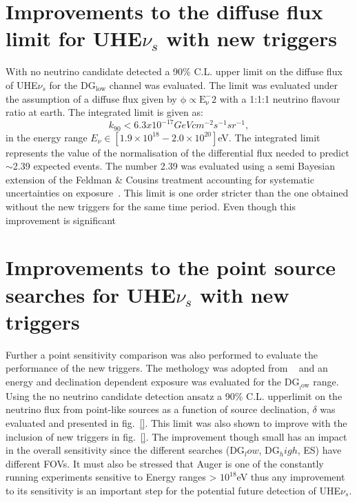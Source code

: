 \section*{Improvements to the diffuse flux limit for UHE$\nu_s$ with new triggers}
With no neutrino candidate detected a 90\% C.L. upper limit on the diffuse flux of UHE$\nu_s$ for the DG$\mathrm{_{low}}$ channel was evaluated. The limit was evaluated under the assumption of a diffuse flux given by $\mathrm{\phi \propto E_{\nu}^-2}$ with a 1:1:1 neutrino flavour ratio at earth. The integrated limit is given as:
\begin{equation}
    k_{90} < 6.3 x 10^{-17} GeV cm^{-2} s^{-1} sr^{-1},
\end{equation}
in the energy range $E_{\nu} \in [1.9 \times 10^{18} - 2.0 \times 10^{20}]$eV. The integrated limit represents the value of the normalisation of the differential flux needed to predict $\sim$2.39 expected events. The number 2.39 was evaluated using a semi Bayesian extension of the Feldman \& Cousins treatment accounting for systematic uncertainties on exposure~\cite{Conrad:2002kn}. This limit is one order stricter than the one obtained without the new triggers for the same time period. Even though this improvement is significant 
\section*{Improvements to the point source searches for UHE$\nu_s$ with new triggers}
Further a point sensitivity comparison was also performed to evaluate the performance of the new triggers. The methology was adopted from ~\cite{Aab_2019_point} and an energy and declination dependent exposure was evaluated for the DG$\mathrm{_{_low}}$ range. Using the no neutrino candidate detection ansatz a 90\% C.L. upperlimit on the neutrino flux from point-like sources as a function of source declination, $\delta$ was evaluated and presented in fig.~\ref{}. This limit was also shown to improve with the inclusion of new triggers in fig.~\ref{}. The improvement though small has an impact in the overall sensitivity since the different searches (DG$_low$, DG$_high$, ES) have different FOVs. It must also be stressed that Auger is one of the constantly running experiments sensitive to Energy ranges > $10^{18}$eV thus any improvement to its sensitivity is an important step for the potential future detection of UHE$\nu_s$.



